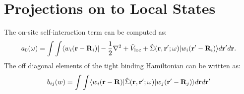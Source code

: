 \section{Projections on to Local States}
The on-site self-interaction term can be computed as:
%
\begin{equation}
a_{0}(\omega) = \int\int\langle w_{i}({\bf r}-{\bf R}_{i})|-\frac{1}{2}\nabla^{2} + \tilde{V}_{\rm loc} + \hat{\Sigma}({\bf r},{\bf r}';\omega)|w_{i}({\bf r}'-{\bf R}_{i})\rangle d{\bf r}'d{\bf r}.
\end{equation}
%
The off diagonal elements of the tight binding Hamiltonian can be written as:
%
\begin{equation}
b_{ij}(w) = \int\int\langle w_{i}({\bf r}-{\bf R})|\hat{\Sigma}({\bf r},{\bf r}';\omega)|w_{j}({\bf r}'-{\bf R}_{j})\rangle d{\bf r} d{\bf r}'
\end{equation}
